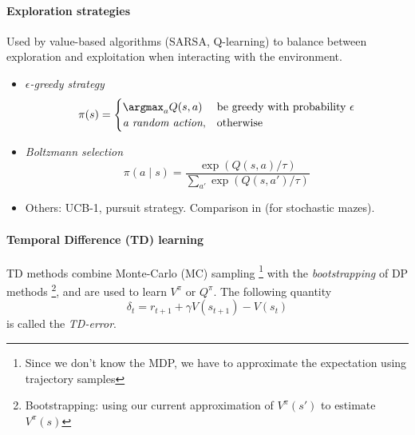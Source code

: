 \paragraph{Exploration strategies} \label{paragraph:exploration-strategies} Used by value-based algorithms (SARSA, Q-learning) to balance between exploration and exploitation when interacting with the environment.
\begin{itemize}
    \item \emph{$\epsilon$-greedy strategy}
        \[
          \pi(s)=\begin{cases}
            \argmax_a Q(s,a) & \text{be greedy with probability $\epsilon$}\\
            \textit{a random action}, & \text{otherwise}
          \end{cases}
        \]
    \item \emph{Boltzmann selection}
        \[
          \pi(a\mid s) = \frac{\exp(Q(s,a)/\tau)}{\sum_{a'} \exp(Q(s,a')/\tau)}
        \]
    \item Others: UCB-1, pursuit strategy. Comparison in \cite{tijsma2016comparing} (for stochastic mazes).
\end{itemize}

\paragraph{Temporal Difference (TD) learning} TD methods combine Monte-Carlo (MC) sampling \footnote{Since we don't know the MDP, we have to approximate the expectation using trajectory samples} with the \emph{bootstrapping} of DP methods \footnote{Bootstrapping: using our current approximation of $V^{\pi}(s')$ to estimate $V^{\pi}(s)$}, and are used to learn $V^\pi$ or $Q^\pi$. The following quantity
\[
    \delta_t = r_{t+1} + \gamma V(s_{t+1}) - V(s_t)
\]
is called the \emph{TD-error}.

